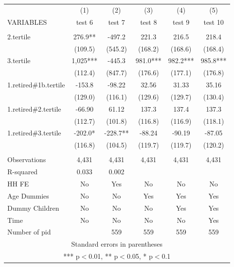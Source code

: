 \begin{tabular}{lccccc} \hline
 & (1) & (2) & (3) & (4) & (5) \\
VARIABLES & test 6 & test 7 & test 8 & test 9 & test 10 \\ \hline
 &  &  &  &  &  \\
2.tertile & 276.9** & -497.2 & 221.3 & 216.5 & 218.4 \\
 & (109.5) & (545.2) & (168.2) & (168.6) & (168.4) \\
3.tertile & 1,025*** & -445.3 & 981.0*** & 982.2*** & 985.8*** \\
 & (112.4) & (847.7) & (176.6) & (177.1) & (176.8) \\
1.retired\#1b.tertile & -153.8 & -98.22 & 32.56 & 31.33 & 35.16 \\
 & (129.0) & (116.1) & (129.6) & (129.7) & (130.4) \\
1.retired\#2.tertile & -66.90 & 61.12 & 137.3 & 137.4 & 137.3 \\
 & (112.7) & (101.8) & (116.8) & (116.9) & (118.1) \\
1.retired\#3.tertile & -202.0* & -228.7** & -88.24 & -90.19 & -87.05 \\
 & (116.8) & (104.5) & (119.7) & (119.7) & (120.2) \\
 &  &  &  &  &  \\
Observations & 4,431 & 4,431 & 4,431 & 4,431 & 4,431 \\
R-squared & 0.033 & 0.002 &  &  &  \\
HH FE & No & Yes & No & No & No \\
Age Dummies & No & No & Yes & Yes & Yes \\
Dummy Children & No & No & No & Yes & Yes \\
Time & No & No & No & No & Yes \\
 Number of pid &  & 559 & 559 & 559 & 559 \\ \hline
\multicolumn{6}{c}{ Standard errors in parentheses} \\
\multicolumn{6}{c}{ *** p$<$0.01, ** p$<$0.05, * p$<$0.1} \\
\end{tabular}
